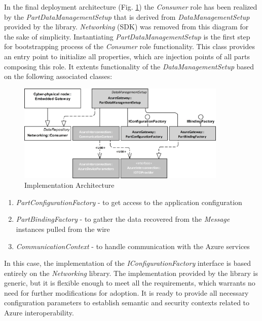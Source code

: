 \documentclass{article}
\begin{document}

In the final deployment architecture (Fig. \ref*{figure4.ImplementationArchitecture}) the \textit{Consumer} role has been realized by the \textit{PartDataManagementSetup} that is derived from \textit{DataManagementSetup} provided by the library. \textit{Networking} (SDK) was removed from this diagram for the sake of simplicity. Instantiating \textit{PartDataManagementSetup} is the first step for bootstrapping process of the \textit{Consumer} role functionality. This class provides an entry point to initialize all properties, which are injection points of all parts composing this role. It extents functionality of the \textit{DataManagementSetup} based on the following associated classes:


\begin{figure}
      \centering
      \includegraphics[width=10cm]{../.Media/ImplementationArchitecture.png}
      \caption{Implementation Architecture}\label{figure4.ImplementationArchitecture}
\end{figure}

\begin{enumerate}
      \item \textit{PartConfigurationFactory} - to get access to the application configuration
      \item \textit{PartBindingFactory} - to gather the data recovered from the \textit{Message} instances pulled from the wire
      \item \textit{CommunicationContext} - to handle communication with the Azure services
\end{enumerate}

In this case, the implementation of the \textit{IConfigurationFactory} interface is based entirely on the \textit{Networking} library. The implementation provided by the library is generic, but it is flexible enough to meet all the requirements, which warrants no need for further modifications for adoption. It is ready to provide all necessary configuration parameters to establish semantic and security contexts related to Azure interoperability.
\end{document}
